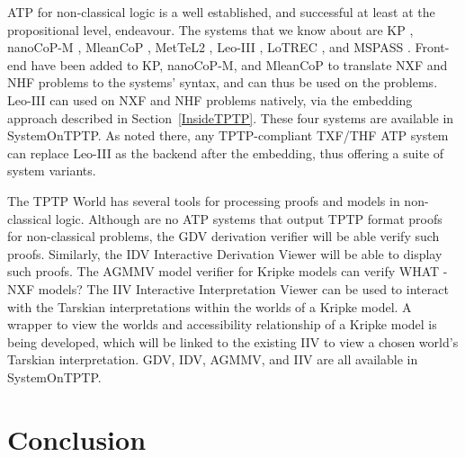 \documentclass[runningheads]{llncs}
\begin{document}
ATP for non-classical logic is a well established, and successful at least at the propositional
level, endeavour.
The systems that we know about are
K\raisebox{-3pt}{S}P \cite{NHD20,PN+21}, nanoCoP-M \cite{Ott21}, MleanCoP \cite{Ott14}, 
MetTeL2 \cite{TSK12}, Leo-III \cite{SB21}, LoTREC \cite{FF+01}, and MSPASS \cite{HS00-TABLEAUX}.
Front-end have been added to K\raisebox{-3pt}{S}P, nanoCoP-M, and MleanCoP to translate NXF
and NHF problems to the systems' syntax, and can thus be used on the problems.
Leo-III can used on NXF and NHF problems natively, via the embedding approach described in 
Section~\ref{InsideTPTP}.
These four systems are available in SystemOnTPTP.
As noted there, any TPTP-compliant TXF/THF ATP system can replace Leo-III as the backend after
the embedding, thus offering a suite of system variants.

The TPTP World has several tools for processing proofs and models in non-classical logic.
Although are no ATP systems that output TPTP format proofs for non-classical problems, the
GDV derivation verifier \cite{Sut06} will be able verify such proofs.
Similarly, the IDV Interactive Derivation Viewer \cite{TPS07} will be able to display such proofs.
The AGMMV model verifier for Kripke models can verify WHAT - NXF models?
The IIV Interactive Interpretation Viewer \cite{MS23-Poster} can be used to interact with the
Tarskian interpretations within the worlds of a Kripke model. 
A wrapper to view the worlds and accessibility relationship of a Kripke model is being developed,
which will be linked to the existing IIV to view a chosen world's Tarskian interpretation.
GDV, IDV, AGMMV, and IIV are all available in SystemOnTPTP.

\section{Conclusion}
\label{Conclusion}



\end{document}
